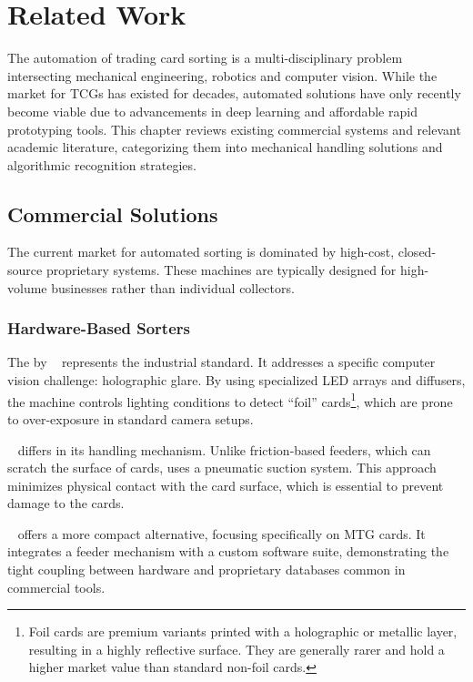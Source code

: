 \chapter{Related Work}\label{chap:rw}

The automation of trading card sorting is a multi-disciplinary problem intersecting mechanical engineering, robotics and computer vision. While the market for \acp{TCG} has existed for decades, automated solutions have only recently become viable due to advancements in deep learning and affordable rapid prototyping tools. This chapter reviews existing commercial systems and relevant academic literature, categorizing them into mechanical handling solutions and algorithmic recognition strategies.

\section{Commercial Solutions}\label{sec:commercial_solutions}
The current market for automated sorting is dominated by high-cost, closed-source proprietary systems. These machines are typically designed for high-volume businesses rather than individual collectors.

\subsection{Hardware-Based Sorters}
The  by ~\cite{tcgmachines} represents the industrial standard. It addresses a specific computer vision challenge: holographic glare. By using specialized LED arrays and diffusers, the machine controls lighting conditions to detect \enquote{foil} cards\footnote{Foil cards are premium variants printed with a holographic or metallic layer, resulting in a highly reflective surface. They are generally rarer and hold a higher market value than standard non-foil cards.}, which are prone to over-exposure in standard camera setups.

~\cite{cardbot} differs in its handling mechanism. Unlike friction-based feeders, which can scratch the surface of cards,  uses a pneumatic suction system. This approach minimizes physical contact with the card surface, which is essential to prevent damage to the cards.

~\cite{magicsorter} offers a more compact alternative, focusing specifically on \ac{MTG} cards. It integrates a feeder mechanism with a custom software suite, demonstrating the tight coupling between hardware and proprietary databases common in commercial tools.

